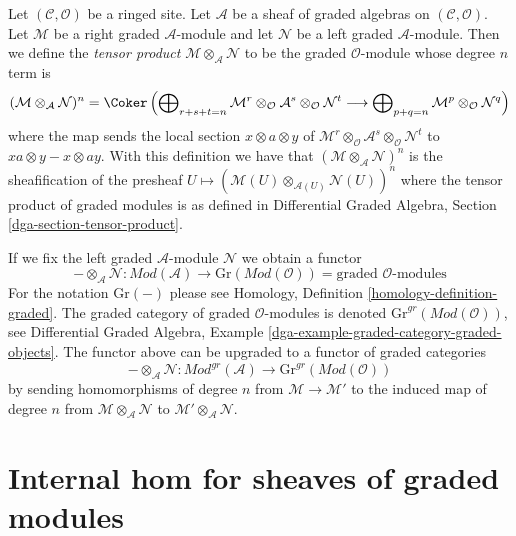 \medskip\noindent
Let $(\mathcal{C}, \mathcal{O})$ be a ringed site. Let $\mathcal{A}$
be a sheaf of graded algebras on $(\mathcal{C}, \mathcal{O})$.
Let $\mathcal{M}$ be a right graded $\mathcal{A}$-module
and let $\mathcal{N}$ be a left graded $\mathcal{A}$-module.
Then we define the {\it tensor product}
$\mathcal{M} \otimes_\mathcal{A} \mathcal{N}$
to be the graded $\mathcal{O}$-module whose degree $n$ term is
$$
(\mathcal{M} \otimes_\mathcal{A} \mathcal{N})^n =
\Coker\left(
\bigoplus\nolimits_{r + s + t = n} \mathcal{M}^r \otimes_\mathcal{O}
\mathcal{A}^s \otimes_\mathcal{O} \mathcal{N}^t
\longrightarrow
\bigoplus\nolimits_{p + q = n} \mathcal{M}^p \otimes_\mathcal{O} \mathcal{N}^q
\right)
$$
where the map sends the local section $x \otimes a \otimes y$
of $\mathcal{M}^r \otimes_\mathcal{O} \mathcal{A}^s
\otimes_\mathcal{O} \mathcal{N}^t$ to
$xa \otimes y - x \otimes ay$.
With this definition we have that
$(\mathcal{M} \otimes_\mathcal{A} \mathcal{N})^n$
is the sheafification of the presheaf
$U \mapsto (\mathcal{M}(U) \otimes_{\mathcal{A}(U)} \mathcal{N}(U))^n$
where the tensor product of graded modules is as defined in
Differential Graded Algebra, Section \ref{dga-section-tensor-product}.

\medskip\noindent
If we fix the left graded $\mathcal{A}$-module $\mathcal{N}$
we obtain a functor
$$
- \otimes_\mathcal{A} \mathcal{N} :
\textit{Mod}(\mathcal{A})
\longrightarrow
\text{Gr}(\textit{Mod}(\mathcal{O})) =
\text{graded }\mathcal{O}\text{-modules}
$$
For the notation $\text{Gr}(-)$ please see
Homology, Definition \ref{homology-definition-graded}.
The graded category of graded $\mathcal{O}$-modules is denoted
$\text{Gr}^{gr}(\textit{Mod}(\mathcal{O}))$, see
Differential Graded Algebra, Example
\ref{dga-example-graded-category-graded-objects}.
The functor above can be upgraded to a functor of graded categories
$$
- \otimes_\mathcal{A} \mathcal{N} :
\textit{Mod}^{gr}(\mathcal{A})
\longrightarrow
\text{Gr}^{gr}(\textit{Mod}(\mathcal{O}))
$$
by sending homomorphisms of degree $n$ from $\mathcal{M} \to \mathcal{M}'$
to the induced map of degree $n$ from
$\mathcal{M} \otimes_\mathcal{A} \mathcal{N}$ to
$\mathcal{M}' \otimes_\mathcal{A} \mathcal{N}$.






\section{Internal hom for sheaves of graded modules}
\label{section-internal-hom-graded}

